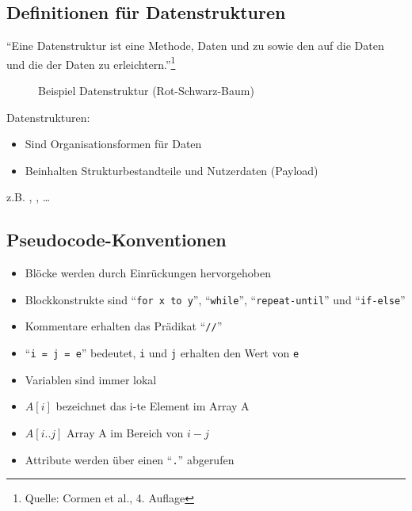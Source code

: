 \documentclass[
    ngerman,
    color=3b,
    load_common, %
    summary,
    boxarc,
]{rubos-tuda-template}
\begin{document}
\subsection{Definitionen für Datenstrukturen}\label{1.3}\label{Definitionen fuer Datenstrukturen}
\begin{definition}[Datenstruktur]
    \enquote{Eine Datenstruktur ist eine Methode,
    Daten  und zu  sowie
    den  auf die Daten und die 
    der Daten zu erleichtern.}\footnote{Quelle: Cormen et al., 4. Auflage}
\end{definition}
\begin{wrapfigure}[5]{r}{.6\textwidth}
    \centering
    \caption{Beispiel Datenstruktur (Rot-Schwarz-Baum)}
    \label{fig:baum_beispiel}
\end{wrapfigure}
Datenstrukturen:\begin{itemize}
    \item Sind Organisationsformen für Daten
    \item Beinhalten Strukturbestandteile und Nutzerdaten (Payload)
\end{itemize}
z.B. , , \ldots
\vspace*{2cm}
\subsection{Pseudocode-Konventionen}
\begin{grayInfoBox}
    \begin{itemize}
        \item Blöcke werden durch Einrückungen hervorgehoben
        \item Blockkonstrukte sind "`\texttt{for x to y}"', "`\texttt{while}"', "`\texttt{repeat-until}"' und "`\texttt{if-else}"'
        \item Kommentare erhalten das Prädikat "`\texttt{//}"'
        \item "`\texttt{i = j = e}"' bedeutet, \texttt{i} und \texttt{j} erhalten den Wert von \texttt{e}
        \item Variablen sind immer lokal
        \item $A[i]$ bezeichnet das i-te Element im Array A
        \item $A[i..j]$ Array A im Bereich von $i-j$
        \item Attribute werden über einen "`\texttt{.}"' abgerufen
    \end{itemize}
\end{grayInfoBox}
\end{document}
